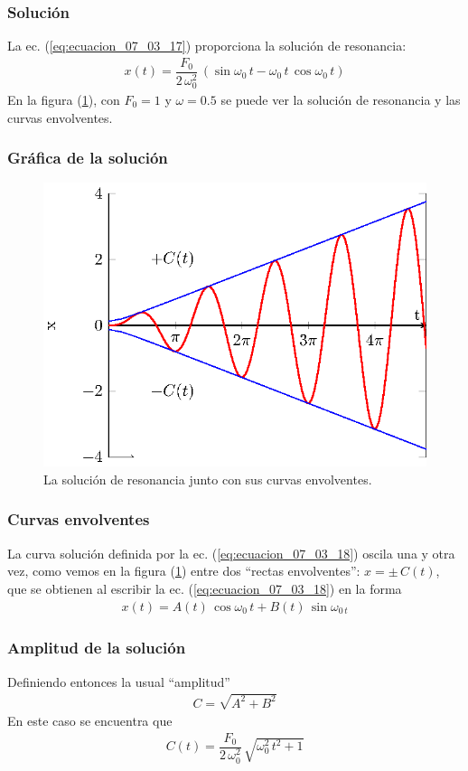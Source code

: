 \begin{frame}
\frametitle{Solución}
La ec. (\ref{eq:ecuacion_07_03_17}) proporciona la solución de resonancia:
\begin{align}
x(t) = \dfrac{F_{0}}{2 \, \omega_{0}^{2}} \, (\sin \omega_{0} \, t - \omega_{0} \, t \, \cos \omega_{0} \, t )
\label{eq:ecuacion_07_03_18}
\end{align}
\pause
En la figura (\ref{fig_figura_07_03_04}), con $F_{0}=1$ y $\omega=0.5$ se puede ver la solución de resonancia y las curvas envolventes.
\end{frame}
\begin{frame}
\frametitle{Gráfica de la solución}
\begin{figure}[H]
    \centering
    \includegraphics[scale=0.95]{Imagenes/sist_masa_resorte_resonancia_plot_01.eps}
    \caption{La solución de resonancia junto con sus curvas envolventes.}
    \label{fig_figura_07_03_04}
\end{figure}
\end{frame}
\begin{frame}
\frametitle{Curvas envolventes}
La curva solución definida por la ec. (\ref{eq:ecuacion_07_03_18}) oscila una y otra vez, como vemos en la figura (\ref{fig_figura_07_03_04}) entre dos \enquote{rectas envolventes}: $x = \pm \, C(t)$, que se obtienen al escribir la ec. (\ref{eq:ecuacion_07_03_18}) en la forma
\begin{align*}
x(t) =  A(t) \, \cos \omega_{0} \, t +  B(t) \, \sin \omega_{0 \, t}
\end{align*}
\end{frame}
\begin{frame}
\frametitle{Amplitud de la solución}
Definiendo entonces la usual \enquote{amplitud}
\begin{align*}
C = \sqrt{A^{2} +  B^{2}}
\end{align*}
\pause
En este caso se encuentra que
\begin{align*}
C(t) = \dfrac{F_{0}}{2 \, \omega_{0}^{2}} \, \sqrt{\omega_{0}^{2} \, t^{2} + 1}
\end{align*}
\end{frame}
